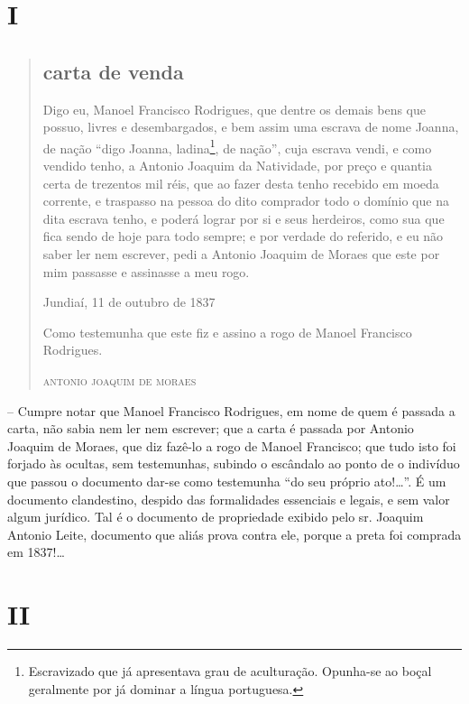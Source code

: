 \section{I}

\begin{quote}
\subsection{carta de venda}

Digo eu, Manoel Francisco Rodrigues, que dentre os demais bens que
possuo, livres e desembargados, e bem assim uma escrava de nome Joanna,
de nação ``digo Joanna, ladina\footnote{ Escravizado que já apresentava
  grau de aculturação. Opunha-se ao boçal geralmente por já dominar a
  língua portuguesa.}, de nação'', cuja escrava vendi, e como vendido
tenho, a Antonio Joaquim da Natividade, por preço e quantia certa de
trezentos mil réis, que ao fazer desta tenho recebido em moeda corrente,
e traspasso na pessoa do dito comprador todo o domínio que na dita
escrava tenho, e poderá lograr por si e seus herdeiros, como sua que
fica sendo de hoje para todo sempre; e por verdade do referido, e eu não
saber ler nem escrever, pedi a Antonio Joaquim de Moraes que este por
mim passasse e assinasse a meu rogo.

\begin{flushright}
Jundiaí, 11 de outubro de 1837

Como testemunha que este fiz e assino a rogo de Manoel Francisco Rodrigues.

\textsc{antonio joaquim de moraes}
\end{flushright}
\end{quote}

-- Cumpre notar que Manoel Francisco Rodrigues, em nome de quem é
passada a carta, não sabia nem ler nem escrever; que a carta é passada
por Antonio Joaquim de Moraes, que diz fazê-lo a rogo de Manoel
Francisco; que tudo isto foi forjado às ocultas, sem testemunhas,
subindo o escândalo ao ponto de o indivíduo que passou o documento
dar-se como testemunha ``do seu próprio ato!\ldots{}''. É um documento
clandestino, despido das formalidades essenciais e legais, e sem valor
algum jurídico. Tal é o documento de propriedade exibido pelo sr.
Joaquim Antonio Leite, documento que aliás prova contra ele, porque a
preta foi comprada em 1837!\ldots{}

\section{II}

